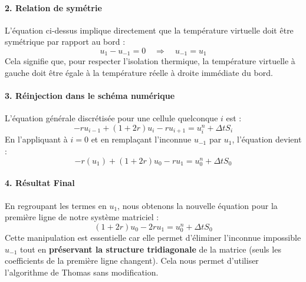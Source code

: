 \documentclass[a4paper,12pt]{article}
\begin{document}
\paragraph{2. Relation de symétrie}
L'équation ci-dessus implique directement que la température virtuelle doit être symétrique par rapport au bord :
\begin{equation}
    u_{1} - u_{-1} = 0 \quad \Longrightarrow \quad u_{-1} = u_{1}
\end{equation}
Cela signifie que, pour respecter l'isolation thermique, la température virtuelle à gauche doit être égale à la température réelle à droite immédiate du bord.

\paragraph{3. Réinjection dans le schéma numérique}
L'équation générale discrétisée pour une cellule quelconque $i$ est :
$$ -r u_{i-1} + (1 + 2r) u_i - r u_{i+1} = u_i^n + \Delta t S_i $$
En l'appliquant à $i=0$ et en remplaçant l'inconnue $u_{-1}$ par $u_{1}$, l'équation devient :
$$ -r (u_{1}) + (1 + 2r) u_0 - r u_{1} = u_0^n + \Delta t S_0 $$

\paragraph{4. Résultat Final}
En regroupant les termes en $u_{1}$, nous obtenons la nouvelle équation pour la première ligne de notre système matriciel :
\begin{equation}
    (1 + 2r) u_0 - 2r u_{1} = u_0^n + \Delta t S_0
\end{equation}
Cette manipulation est essentielle car elle permet d'éliminer l'inconnue impossible $u_{-1}$ tout en \textbf{préservant la structure tridiagonale} de la matrice (seuls les coefficients de la première ligne changent). Cela nous permet d'utiliser l'algorithme de Thomas sans modification.
\end{document}
